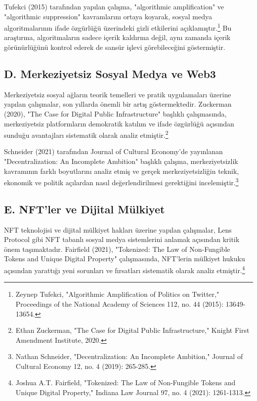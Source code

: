 \documentclass[11pt,a4paper]{article}
\begin{document}
Tufekci (2015) tarafından yapılan çalışma, "algorithmic amplification" ve "algorithmic suppression" kavramlarını ortaya koyarak, sosyal medya algoritmalarının ifade özgürlüğü üzerindeki gizli etkilerini açıklamıştır.\footnote{Zeynep Tufekci, "Algorithmic Amplification of Politics on Twitter," Proceedings of the National Academy of Sciences 112, no. 44 (2015): 13649-13654.} Bu araştırma, algoritmaların sadece içerik kaldırma değil, aynı zamanda içerik görünürlüğünü kontrol ederek de sansür işlevi görebileceğini göstermiştir.

\subsection*{\fontsize{12}{14}\selectfont\bfseries D. Merkeziyetsiz Sosyal Medya ve Web3}

Merkeziyetsiz sosyal ağların teorik temelleri ve pratik uygulamaları üzerine yapılan çalışmalar, son yıllarda önemli bir artış göstermektedir. Zuckerman (2020), "The Case for Digital Public Infrastructure" başlıklı çalışmasında, merkeziyetsiz platformların demokratik katılım ve ifade özgürlüğü açısından sunduğu avantajları sistematik olarak analiz etmiştir.\footnote{Ethan Zuckerman, "The Case for Digital Public Infrastructure," Knight First Amendment Institute, 2020.}

Schneider (2021) tarafından Journal of Cultural Economy'de yayınlanan "Decentralization: An Incomplete Ambition" başlıklı çalışma, merkeziyetsizlik kavramının farklı boyutlarını analiz etmiş ve gerçek merkeziyetsizliğin teknik, ekonomik ve politik açılardan nasıl değerlendirilmesi gerektiğini incelemiştir.\footnote{Nathan Schneider, "Decentralization: An Incomplete Ambition," Journal of Cultural Economy 12, no. 4 (2019): 265-285.}

\subsection*{\fontsize{12}{14}\selectfont\bfseries E. NFT'ler ve Dijital Mülkiyet}

NFT teknolojisi ve dijital mülkiyet hakları üzerine yapılan çalışmalar, Lens Protocol gibi NFT tabanlı sosyal medya sistemlerini anlamak açısından kritik önem taşımaktadır. Fairfield (2021), "Tokenized: The Law of Non-Fungible Tokens and Unique Digital Property" çalışmasında, NFT'lerin mülkiyet hukuku açısından yarattığı yeni sorunları ve fırsatları sistematik olarak analiz etmiştir.\footnote{Joshua A.T. Fairfield, "Tokenized: The Law of Non-Fungible Tokens and Unique Digital Property," Indiana Law Journal 97, no. 4 (2021): 1261-1313.}
\end{document}
